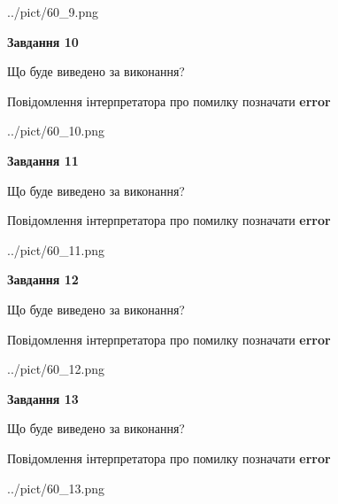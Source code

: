 \documentclass[11pt, ukrainian]{article}
\begin{document}
{\begin {large}
\begin{center}
	{../pict/60_9.png}
\end{center}
\newpage

{\begin {center}\textbf{Завдання 10}\end {center}}\par
Що буде виведено за виконання? \par
Повідомлення інтерпретатора про помилку позначати \textbf{error}

\begin{center}
	{../pict/60_10.png}
\end{center}
\newpage

{\begin {center}\textbf{Завдання 11}\end {center}}\par
Що буде виведено за виконання? \par
Повідомлення інтерпретатора про помилку позначати \textbf{error}

\begin{center}
	{../pict/60_11.png}
\end{center}
\newpage

{\begin {center}\textbf{Завдання 12}\end {center}}\par
Що буде виведено за виконання? \par
Повідомлення інтерпретатора про помилку позначати \textbf{error}

\begin{center}
	{../pict/60_12.png}
\end{center}
\newpage

{\begin {center}\textbf{Завдання 13}\end {center}}\par
Що буде виведено за виконання? \par
Повідомлення інтерпретатора про помилку позначати \textbf{error}

\begin{center}
	{../pict/60_13.png}
\end{center}
\newpage


\end{large}}
\end{document}
